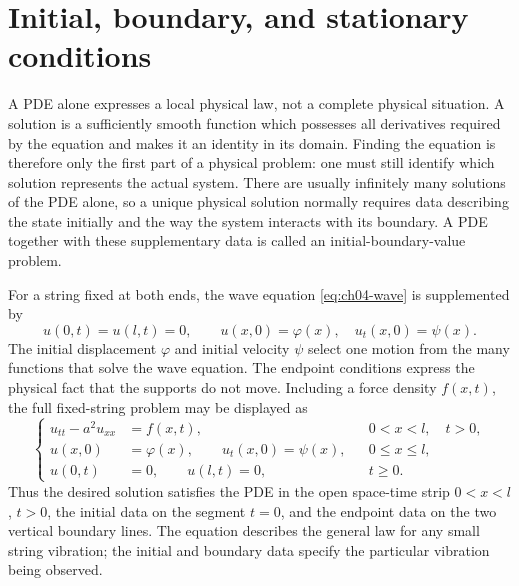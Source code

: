 \section{Initial, boundary, and stationary conditions}

A PDE alone expresses a local physical law, not a complete physical situation. A solution is a sufficiently smooth function which possesses all derivatives required by the equation and makes it an identity in its domain. Finding the equation is therefore only the first part of a physical problem: one must still identify which solution represents the actual system. There are usually infinitely many solutions of the PDE alone, so a unique physical solution normally requires data describing the state initially and the way the system interacts with its boundary. A PDE together with these supplementary data is called an initial-boundary-value problem.

For a string fixed at both ends, the wave equation \eqref{eq:ch04-wave} is supplemented by
\begin{equation}
u(0,t)=u(l,t)=0,
\qquad
u(x,0)=\varphi(x),\quad u_t(x,0)=\psi(x).
\label{eq:ch04-string-ibvp}
\end{equation}
The initial displacement $\varphi$ and initial velocity $\psi$ select one motion from the many functions that solve the wave equation. The endpoint conditions express the physical fact that the supports do not move. Including a force density $f(x,t)$, the full fixed-string problem may be displayed as
\begin{equation}
\left\{
\begin{aligned}
u_{tt}-a^2u_{xx}&=f(x,t), &&0<x<l,\quad t>0,\\
u(x,0)&=\varphi(x),\qquad u_t(x,0)=\psi(x), &&0\leq x\leq l,\\
u(0,t)&=0,\qquad u(l,t)=0, &&t\geq0.
\end{aligned}
\right.
\label{eq:ch04-full-string-ibvp}
\end{equation}
Thus the desired solution satisfies the PDE in the open space-time strip $0<x<l$, $t>0$, the initial data on the segment $t=0$, and the endpoint data on the two vertical boundary lines. The equation describes the general law for any small string vibration; the initial and boundary data specify the particular vibration being observed.

